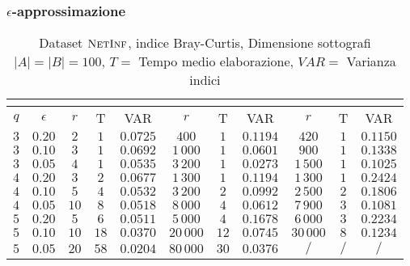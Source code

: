 \begin{frame}
	\frametitle{$\epsilon$-approssimazione}
	\centering
	\begin{table}[ht]
		\centering
		\begin{tabular}{|c|c|c|c|c|c|c|c|c|c|c|}
			\cline{3-11}
			\multicolumn{2}{c|}{} & \multicolumn{3}{c|}{\fcount} & \multicolumn{3}{c|}{\fsamp} & \multicolumn{3}{c|}{\base}\\
			\hline	
			$q$ & $\epsilon$ & $r$ & T    & VAR      & $r$ & T    & VAR      & $r$ & T   & VAR      \\ \hline
			$3$ & $0.20$     & \color{green}$2$  & $1$  & $0.0725$ & \color{orange}$400$     & $1$  & $0.1194$ & \color{   red}$420$     & $1$ & $0.1150$ \\ \hline
			$3$ & $0.10$     & \color{green}$3$  & $1$  & $0.0692$ & \color{   red}$1\,000$  & $1$  & $0.0601$ & \color{orange}$900$     & $1$ & $0.1338$ \\ \hline
			$3$ & $0.05$     & \color{green}$4$  & $1$  & $0.0535$ & \color{   red}$3\,200$  & $1$  & $0.0273$ & \color{orange}$1\,500$  & $1$ & $0.1025$ \\ \hline
			\hline
			$4$ & $0.20$     & \color{green}$3$  & $2$  & $0.0677$ & \color{   red}$1\,300$  & $1$  & $0.1194$ & \color{orange}$1\,300$  & $1$ & $0.2424$ \\ \hline
			$4$ & $0.10$     & \color{green}$5$  & $4$  & $0.0532$ & \color{   red}$3\,200$  & $2$  & $0.0992$ & \color{orange}$2\,500$  & $2$ & $0.1806$ \\ \hline
			$4$ & $0.05$     & \color{green}$10$ & $8$  & $0.0518$ & \color{   red}$8\,000$  & $4$  & $0.0612$ & \color{orange}$7\,900$  & $3$ & $0.1081$ \\ \hline
			\hline
			$5$ & $0.20$     & \color{green}$5$  & $6$  & $0.0511$ & \color{orange}$5\,000$  & $4$  & $0.1678$ & \color{   red}$6\,000$  & $3$ & $0.2234$ \\ \hline
			$5$ & $0.10$     & \color{green}$10$ & $18$ & $0.0370$ & \color{orange}$20\,000$ & $12$ & $0.0745$ & \color{   red}$30\,000$ & $8$ & $0.1234$ \\ \hline
			$5$ & $0.05$     & \color{green}$20$ & $58$ & $0.0204$ & \color{orange}$80\,000$ & $30$ & $0.0376$ & \color{   red}$/$       & $/$ & $/$      \\ \hline
		\end{tabular}
		\caption{Dataset $\textsc{NetInf}$, indice Bray-Curtis, Dimensione sottografi $|A| = |B| = 100$, $T = $ Tempo medio elaborazione, $VAR = $ Varianza indici}
	\end{table}
\end{frame}

